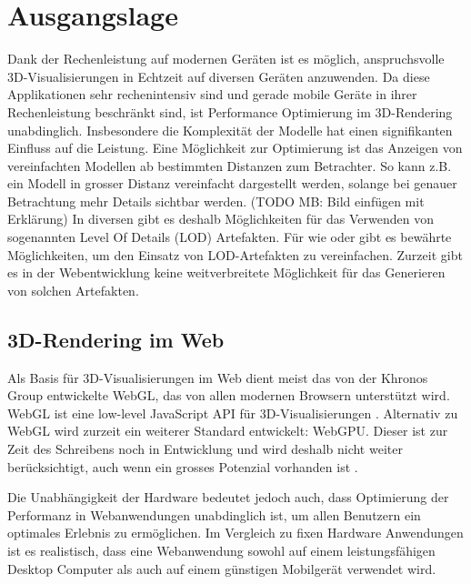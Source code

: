 \section{Ausgangslage}
Dank der Rechenleistung auf modernen Geräten ist es möglich, anspruchsvolle 3D-Visualisierungen in Echtzeit auf diversen Geräten anzuwenden. Da diese Applikationen sehr rechenintensiv sind und gerade mobile Geräte in ihrer Rechenleistung beschränkt sind, ist Performance Optimierung im 3D-Rendering unabdinglich. Insbesondere die Komplexität der Modelle hat einen signifikanten Einfluss auf die Leistung.
Eine Möglichkeit zur Optimierung ist das Anzeigen von vereinfachten Modellen ab bestimmten Distanzen zum Betrachter. So kann z.B. ein Modell in grosser Distanz vereinfacht dargestellt werden, solange bei genauer Betrachtung mehr Details sichtbar werden.
(TODO MB: Bild einfügen mit Erklärung)
In diversen  gibt es deshalb Möglichkeiten für das Verwenden von sogenannten Level Of Details (LOD) Artefakten.
Für  wie  oder  gibt es bewährte Möglichkeiten, um den Einsatz von LOD-Artefakten zu vereinfachen. Zurzeit gibt es in der Webentwicklung keine weitverbreitete Möglichkeit für das Generieren von solchen Artefakten.

\subsection{3D-Rendering im Web}

Als Basis für 3D-Visualisierungen im Web dient meist das von der Khronos Group entwickelte WebGL, das von allen modernen Browsern unterstützt wird. WebGL ist eine low-level JavaScript API für 3D-Visualisierungen \cite{webGl1Spec}.
Alternativ zu WebGL wird zurzeit ein weiterer Standard entwickelt: WebGPU. Dieser ist zur Zeit des Schreibens noch in Entwicklung und wird deshalb nicht weiter berücksichtigt, auch wenn ein grosses Potenzial vorhanden ist \cite{webGPUCharter}.

Die Unabhängigkeit der Hardware bedeutet jedoch auch, dass Optimierung der Performanz in Webanwendungen unabdinglich ist, um allen Benutzern ein optimales Erlebnis zu ermöglichen.
Im Vergleich zu fixen Hardware Anwendungen ist es realistisch, dass eine Webanwendung sowohl auf einem leistungsfähigen Desktop Computer als auch auf einem günstigen Mobilgerät verwendet wird.

